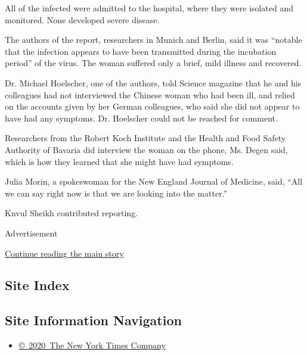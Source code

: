 All of the infected were admitted to the hospital, where they were
isolated and monitored. None developed severe disease.

The authors of the report, researchers in Munich and Berlin, said it was
``notable that the infection appears to have been transmitted during the
incubation period'' of the virus. The woman suffered only a brief, mild
illness and recovered.

Dr. Michael Hoelscher, one of the authors, told Science magazine that he
and his colleagues had not interviewed the Chinese woman who had been
ill, and relied on the accounts given by her German colleagues, who said
she did not appear to have had any symptoms. Dr. Hoelscher could not be
reached for comment.

Researchers from the Robert Koch Institute and the Health and Food
Safety Authority of Bavaria did interview the woman on the phone, Ms.
Degen said, which is how they learned that she might have had symptoms.

Julia Morin, a spokeswoman for the New England Journal of Medicine,
said, ``All we can say right now is that we are looking into the
matter.''

Knvul Sheikh contributed reporting.

Advertisement

\protect\hyperlink{after-bottom}{Continue reading the main story}

\hypertarget{site-index}{%
\subsection{Site Index}\label{site-index}}

\hypertarget{site-information-navigation}{%
\subsection{Site Information
Navigation}\label{site-information-navigation}}

\begin{itemize}
\tightlist
\item
  \href{https://help.nytimes.com/hc/en-us/articles/115014792127-Copyright-notice}{©~2020~The
  New York Times Company}
\end{itemize}


